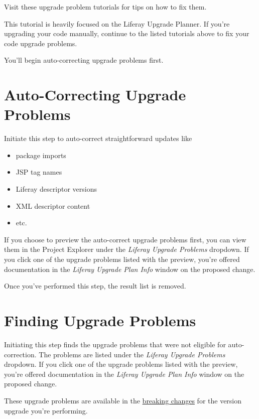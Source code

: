 Visit these upgrade problem tutorials for tips on how to fix them.

This tutorial is heavily focused on the Liferay Upgrade Planner. If
you're upgrading your code manually, continue to the listed tutorials
above to fix your code upgrade problems.

You'll begin auto-correcting upgrade problems first.

\section{Auto-Correcting Upgrade
Problems}\label{auto-correcting-upgrade-problems}

Initiate this step to auto-correct straightforward updates like

\begin{itemize}
\tightlist
\item
  package imports
\item
  JSP tag names
\item
  Liferay descriptor versions
\item
  XML descriptor content
\item
  etc.
\end{itemize}

If you choose to preview the auto-correct upgrade problems first, you
can view them in the Project Explorer under the \emph{Liferay Upgrade
Problems} dropdown. If you click one of the upgrade problems listed with
the preview, you're offered documentation in the \emph{Liferay Upgrade
Plan Info} window on the proposed change.

Once you've performed this step, the result list is removed.

\section{Finding Upgrade Problems}\label{finding-upgrade-problems}

Initiating this step finds the upgrade problems that were not eligible
for auto-correction. The problems are listed under the \emph{Liferay
Upgrade Problems} dropdown. If you click one of the upgrade problems
listed with the preview, you're offered documentation in the
\emph{Liferay Upgrade Plan Info} window on the proposed change.

These upgrade problems are available in the
\href{/docs/7-2/tutorials/-/knowledge_base/t/resolving-breaking-changes}{breaking
changes} for the version upgrade you're performing.

